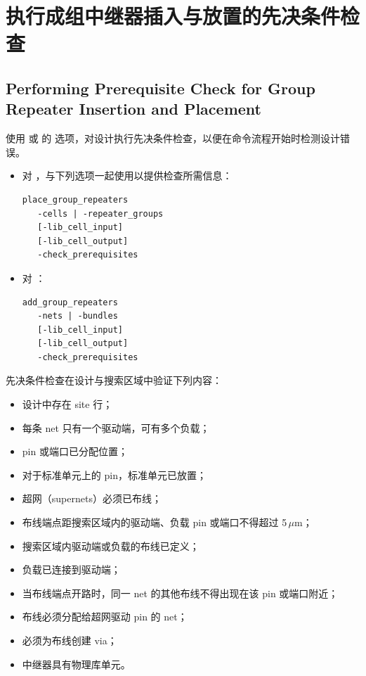 \section{执行成组中继器插入与放置的先决条件检查}
\subsection*{Performing Prerequisite Check for Group Repeater Insertion and Placement}

使用  或  的  选项，对设计执行先决条件检查，以便在命令流程开始时检测设计错误。

\begin{itemize}
  \item 对 ，与下列选项一起使用以提供检查所需信息：
\begin{lstlisting}
place_group_repeaters
   -cells | -repeater_groups
   [-lib_cell_input]
   [-lib_cell_output]
   -check_prerequisites
\end{lstlisting}
  \item 对 ：
\begin{lstlisting}
add_group_repeaters
   -nets | -bundles
   [-lib_cell_input]
   [-lib_cell_output]
   -check_prerequisites
\end{lstlisting}
\end{itemize}

先决条件检查在设计与搜索区域中验证下列内容：
\begin{itemize}
  \item 设计中存在 site 行；
  \item 每条 net 只有一个驱动端，可有多个负载；
  \item pin 或端口已分配位置；
  \item 对于标准单元上的 pin，标准单元已放置；
  \item 超网（supernets）必须已布线；
  \item 布线端点距搜索区域内的驱动端、负载 pin 或端口不得超过 5\,$\mu$m；
  \item 搜索区域内驱动端或负载的布线已定义；
  \item 负载已连接到驱动端；
  \item 当布线端点开路时，同一 net 的其他布线不得出现在该 pin 或端口附近；
  \item 布线必须分配给超网驱动 pin 的 net；
  \item 必须为布线创建 via；
  \item 中继器具有物理库单元。
\end{itemize}

